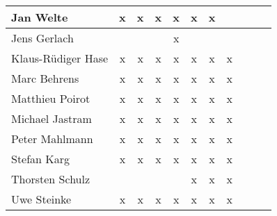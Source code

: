 \documentclass[a4paper, 11pt]{article}
\begin{document}
\begin{tabular}{|l|c|c|c|c|c|c|c|c|c|c|}
Jan Welte             & x & x & x & x & x & x &   \\\hline
Jens Gerlach          &   &   &   & x &  &  &   \\\hline
Klaus-R\"udiger Hase & x & x & x & x & x & x & x \\\hline
Marc Behrens         & x & x & x & x & x & x & x  \\\hline
Matthieu Poirot       & x & x & x & x & x & x & x  \\\hline
Michael Jastram       & x & x & x & x & x & x & x  \\\hline
Peter Mahlmann        & x & x & x & x & x & x & x \\\hline
Stefan Karg          & x  & x & x  & x & x & x & x \\\hline
Thorsten Schulz      &   &   &  &  & x & x & x \\\hline
Uwe Steinke          & x & x & x & x & x & x & x \\\hline
\end{tabular}
\end{document}
